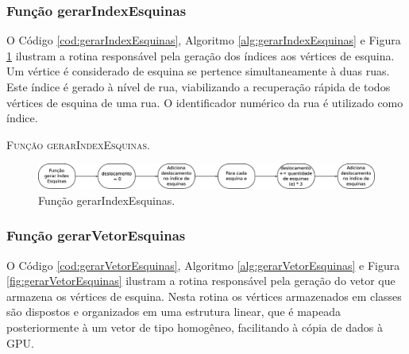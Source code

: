 \newpage

\subsubsection{Função gerarIndexEsquinas}

O Código \ref{cod:gerarIndexEsquinas}, Algoritmo \ref{alg:gerarIndexEsquinas} e Figura \ref{fig:gerarIndexEsquinas} ilustram a rotina responsável pela geração dos índices aos vértices de esquina. Um vértice é considerado de esquina se pertence simultaneamente à duas ruas. Este índice é gerado à nível de rua, viabilizando a recuperação rápida de todos vértices de esquina de uma rua. O identificador numérico da rua é utilizado como índice.  



\begin{algorithm}[H]
   \SetAlgoLined   
   
   \caption{\textsc{Função gerarIndexEsquinas.}}
   \label{alg:gerarIndexEsquinas}
\end{algorithm}

\begin{figure}[H]
  \centering
  \includegraphics[width=1\textwidth]{Figuras/Simula/Fluxos/gerarIndexEsquinas.eps}
  \caption{Função gerarIndexEsquinas.}
  \label{fig:gerarIndexEsquinas}
\end{figure} 

\newpage

\subsubsection{Função gerarVetorEsquinas}

O Código \ref{cod:gerarVetorEsquinas}, Algoritmo \ref{alg:gerarVetorEsquinas} e Figura \ref{fig:gerarVetorEsquinas} ilustram a rotina responsável pela geração do vetor que armazena os vértices de esquina. Nesta rotina os vértices armazenados em classes são dispostos e organizados em uma estrutura linear, que é mapeada posteriormente à um vetor de tipo homogêneo, facilitando à cópia de dados à GPU.



